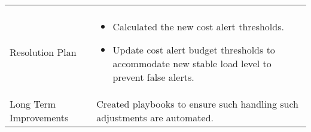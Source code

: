 \begin{table*}[ht!]
\begin{threeparttable}
\begin{tabular}{m{}m{}}
\begin{itemize}[left=0pt, topsep=0pt, partopsep=0pt, itemsep=0pt, parsep=0pt]
            \end{itemize} \\
            Resolution Plan & \begin{itemize}[left=0pt, topsep=0pt, partopsep=0pt, itemsep=0pt, parsep=0pt]
                \item Calculated the new cost alert thresholds.
                \item  Update cost alert budget thresholds to accommodate new stable load level to prevent false alerts.
            \end{itemize} \\ 
            Long Term Improvements & Created playbooks to ensure such handling such adjustments are automated. \\
            \bottomrule
        \end{tabular}
    \end{threeparttable}
\end{table*}


